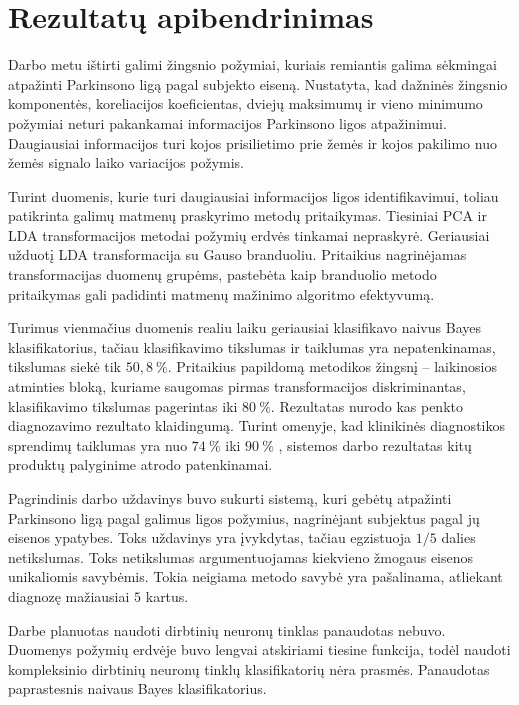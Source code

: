 \documentclass[]{vgtuef}
\begin{document}
\section{Rezultatų apibendrinimas}


Darbo metu ištirti galimi žingsnio požymiai, kuriais remiantis galima sėkmingai atpažinti Parkinsono ligą pagal subjekto eiseną. Nustatyta, kad dažninės žingsnio komponentės, koreliacijos koeficientas, dviejų maksimumų ir vieno minimumo požymiai neturi pakankamai informacijos Parkinsono ligos atpažinimui. Daugiausiai informacijos turi kojos prisilietimo prie žemės ir kojos pakilimo nuo žemės signalo laiko variacijos požymis.

Turint duomenis, kurie turi daugiausiai informacijos ligos identifikavimui, toliau patikrinta galimų matmenų praskyrimo metodų pritaikymas. Tiesiniai PCA ir LDA transformacijos metodai požymių erdvės tinkamai nepraskyrė. Geriausiai užduotį LDA transformacija su Gauso branduoliu. Pritaikius nagrinėjamas transformacijas duomenų grupėms, pastebėta kaip branduolio metodo pritaikymas gali padidinti matmenų mažinimo algoritmo efektyvumą.


Turimus vienmačius duomenis realiu laiku geriausiai klasifikavo naivus Bayes klasifikatorius, tačiau klasifikavimo tikslumas ir taiklumas yra nepatenkinamas, tikslumas siekė tik $50,8~\%$. Pritaikius papildomą metodikos žingsnį -- laikinosios atminties bloką, kuriame saugomas pirmas transformacijos diskriminantas, klasifikavimo tikslumas pagerintas iki $80~\%$. Rezultatas nurodo kas penkto diagnozavimo rezultato klaidingumą. Turint omenyje, kad klinikinės diagnostikos sprendimų taiklumas yra nuo $74~\%$ iki $90~\%$ \cite{vgtu}, sistemos darbo rezultatas kitų produktų palyginime atrodo patenkinamai.


Pagrindinis darbo uždavinys buvo sukurti sistemą, kuri gebėtų atpažinti Parkinsono ligą pagal galimus ligos požymius, nagrinėjant subjektus pagal jų eisenos ypatybes. Toks uždavinys yra įvykdytas, tačiau egzistuoja $1/5$ dalies netikslumas. Toks netikslumas argumentuojamas kiekvieno žmogaus eisenos unikaliomis savybėmis. Tokia neigiama metodo savybė yra pašalinama, atliekant diagnozę mažiausiai $5$ kartus.

Darbe planuotas naudoti dirbtinių neuronų tinklas panaudotas nebuvo. Duomenys požymių erdvėje buvo lengvai atskiriami tiesine funkcija, todėl naudoti kompleksinio dirbtinių neuronų tinklų klasifikatorių nėra prasmės. Panaudotas paprastesnis naivaus Bayes klasifikatorius.
\end{document}
